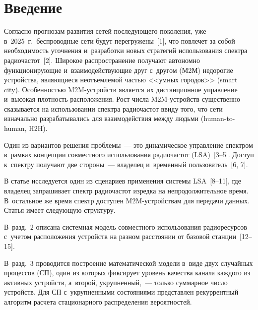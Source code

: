 
\vspace*{6pt}



\thispagestyle{headings}

\begin{multicols}{2}

\label{st\stat}

\section{Введение}

  Согласно прогнозам развития сетей по\-сле\-ду\-юще\-го поколения, 
  уже в~2025~г.\ беспроводные сети будут перегружены~[1], что 
повлечет за собой необходимость уточнения и~разработки новых стратегий 
использования спектра радиочастот~[2]. Широкое распространение получают 
автономно функционирующие и~взаимодействующие друг с~другом  
(М2М) недорогие устройства, являющиеся неотъемлемой 
частью <<умных городов>> (smart city). Особенностью M2M-устройств 
является их дистанционное управ\-ле\-ние и~высокая плот\-ность расположения. 
Рост числа M2M-устройств существенно сказывается на использовании спектра 
ра\-дио\-час\-тот ввиду того, что сети изначально разрабатывались для 
взаимодействия между людьми (human-to-human, H2H). 
{

}

Один из вариантов 
решения проб\-ле\-мы~--- это динамическое управление спектром в~рамках 
концепции совместного использования радиочастот 
(LSA)~[3--5]. Доступ к~спектру получают две стороны~--- владелец и~временный 
пользователь~[6, 7]. 

  В статье исследуется один из сценариев применения системы LSA~[8--11], 
где владелец запрашивает спектр радиочастот изредка на непродолжительное 
время. В~остальное же время спектр доступен M2M-устрой\-ст\-вам для 
передачи данных. Статья имеет следующую структуру. 

В~разд.~2 описана 
системная модель совместного использования радиоресурсов с~учетом 
расположения устройств на разном расстоянии от базовой станции~[12--15]. 

В~разд.~3 проводится построение математической модели в~виде двух 
случайных процессов (СП), один из которых фиксирует уровень качества 
канала каж\-до\-го из активных устройств, а~второй, укрупненный,~--- только 
суммарное число устройств. Для СП с~укрупненными со\-сто\-яни\-ями представлен 
рекуррентный алгоритм расчета стационарного распределения вероятностей. 


\end{multicols}
